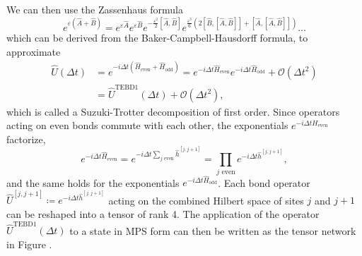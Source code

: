 We can then use the Zassenhaus formula
\begin{equation}
	e^{\varepsilon(\hat{A}+\hat{B})} = e^{\varepsilon \hat{A}} e^{\varepsilon \hat{B}} e^{-\frac{\varepsilon^2}{2}[\hat{A}, \hat{B}]} e^{\frac{\varepsilon^3}{6}\left(2[\hat{B},[\hat{A},\hat{B}]]+[\hat{A},[\hat{A},\hat{B}]]\right)} \dots
\end{equation}
which can be derived from the Baker-Campbell-Hausdorff formula, to approximate
\begin{equation}
	\label{eq:mps_first_order_tebd}
	\begin{split}
		\hat{U}(\Delta t) &= e^{-i\Delta t\left(\hat{H}_\text{even} + \hat{H}_\text{odd}\right)} = e^{-i\Delta t\hat{H}_\text{even}}e^{-i\Delta t\hat{H}_\text{odd}} + \mathcal{O}\left(\Delta t^2\right) \\
		&= \hat{U}^\text{TEBD1}(\Delta t) + \mathcal{O}\left(\Delta t^2\right),
	\end{split}
\end{equation}
which is called a Suzuki-Trotter decomposition of first order. Since operators acting on even bonds commute with each other, the exponentials $e^{-i\Delta tH_\text{even}}$ factorize,
\begin{equation}
	e^{-i\Delta t\hat{H}_\text{even}} = e^{-i\Delta t\sum_{j \text{ even}} \hat{h}^{[j, j+1]}} = \prod_{j \text{ even}} e^{-i\Delta t \hat{h}^{[j, j+1]}},
\end{equation}
and the same holds for the exponentials $e^{-i\Delta t\hat{H}_\text{odd}}$. Each bond operator $\hat{U}^{[j, j+1]} \coloneqq e^{-i\Delta t \hat{h}^{[j, j+1]}}$ acting on the combined Hilbert space of sites $j$ and $j+1$ can be reshaped into a tensor of rank 4. The application of the operator $\hat{U}^\text{TEBD1}(\Delta t)$ to a state in MPS form can then be written as the tensor network in Figure .
